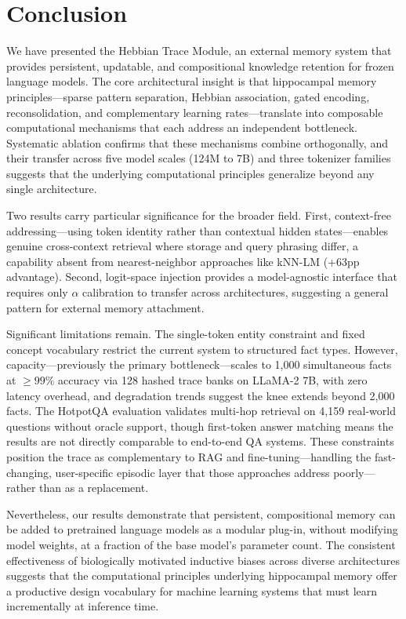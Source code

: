 \documentclass[11pt,a4paper]{article}
\begin{document}
\section{Conclusion}

We have presented the Hebbian Trace Module, an external memory system that provides persistent, updatable, and compositional knowledge retention for frozen language models. The core architectural insight is that hippocampal memory principles---sparse pattern separation, Hebbian association, gated encoding, reconsolidation, and complementary learning rates---translate into composable computational mechanisms that each address an independent bottleneck. Systematic ablation confirms that these mechanisms combine orthogonally, and their transfer across five model scales (124M to 7B) and three tokenizer families suggests that the underlying computational principles generalize beyond any single architecture.

Two results carry particular significance for the broader field. First, context-free addressing---using token identity rather than contextual hidden states---enables genuine cross-context retrieval where storage and query phrasing differ, a capability absent from nearest-neighbor approaches like kNN-LM (+63pp advantage). Second, logit-space injection provides a model-agnostic interface that requires only $\alpha$ calibration to transfer across architectures, suggesting a general pattern for external memory attachment.

Significant limitations remain. The single-token entity constraint and fixed concept vocabulary restrict the current system to structured fact types. However, capacity---previously the primary bottleneck---scales to 1,000 simultaneous facts at ${\geq}99\%$ accuracy via 128 hashed trace banks on LLaMA-2 7B, with zero latency overhead, and degradation trends suggest the knee extends beyond 2,000 facts. The HotpotQA evaluation validates multi-hop retrieval on 4,159 real-world questions without oracle support, though first-token answer matching means the results are not directly comparable to end-to-end QA systems. These constraints position the trace as complementary to RAG and fine-tuning---handling the fast-changing, user-specific episodic layer that those approaches address poorly---rather than as a replacement.

Nevertheless, our results demonstrate that persistent, compositional memory can be added to pretrained language models as a modular plug-in, without modifying model weights, at a fraction of the base model's parameter count. The consistent effectiveness of biologically motivated inductive biases across diverse architectures suggests that the computational principles underlying hippocampal memory offer a productive design vocabulary for machine learning systems that must learn incrementally at inference time.


\end{document}
